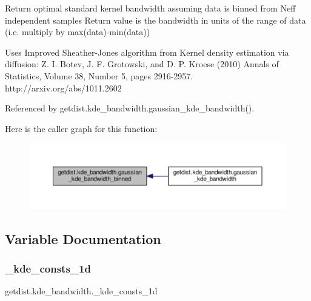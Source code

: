 \begin{DoxyVerb} Return optimal standard kernel bandwidth assuming data is binned from Neff independent samples
 Return value is the bandwidth in units of the range of data (i.e. multiply by max(data)-min(data))

 Uses Improved Sheather-Jones algorithm from
 Kernel density estimation via diffusion: Z. I. Botev, J. F. Grotowski, and D. P. Kroese (2010)
 Annals of Statistics, Volume 38, Number 5, pages 2916-2957. 
 http://arxiv.org/abs/1011.2602
\end{DoxyVerb}
 

Referenced by getdist.\+kde\+\_\+bandwidth.\+gaussian\+\_\+kde\+\_\+bandwidth().

Here is the caller graph for this function\+:
\nopagebreak
\begin{figure}[H]
\begin{center}
\leavevmode
\includegraphics[width=350pt]{namespacegetdist_1_1kde__bandwidth_a87c7248527d8c44ff87753be76949fde_icgraph}
\end{center}
\end{figure}


\subsection{Variable Documentation}
\mbox{\label{namespacegetdist_1_1kde__bandwidth_a6ccd1e18c748bab78b5e71f61be3957d}} 
\subsubsection{\texorpdfstring{\+\_\+kde\+\_\+consts\+\_\+1d}{\_kde\_consts\_1d}}
{\footnotesize\ttfamily getdist.\+kde\+\_\+bandwidth.\+\_\+kde\+\_\+consts\+\_\+1d\hspace{0.3cm}{\ttfamily [private]}}

